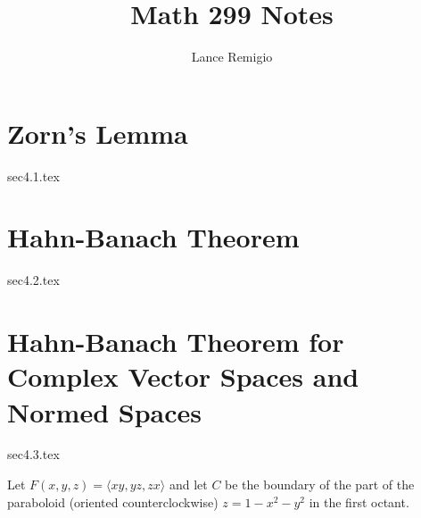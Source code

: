 \documentclass[a4paper]{article}
\title{Math 299 Notes}
\author{Lance Remigio}
\begin{document}
\maketitle
\tableofcontents

\section{Zorn's Lemma}

{sec4.1.tex}

\section{Hahn-Banach Theorem}

{sec4.2.tex}

\section{Hahn-Banach Theorem for Complex Vector Spaces and Normed Spaces}

{sec4.3.tex}

Let \( F(x,y,z) = \langle xy , yz, zx \rangle \) and let \( C  \) be the boundary of the part of the paraboloid (oriented counterclockwise) \( z = 1 - x^{2} - y^{2} \) in the first octant.
\end{document}
